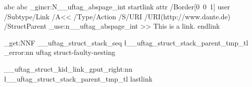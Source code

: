 \documentclass{article}
\begin{document}
\leavevmode
{}
abc
\tagmcend
{}
abc
\tagmcend
{}
\ExplSyntaxOn
\int_gincr:N\g__uftag_abspage_int
\pdfextension startlink
    attr {/Border[0~0~1]}
    user{
        /Subtype/Link%
        /A<<%
         /Type/Action%
         /S/URI%
         /URI(http://www.dante.de)%
         /StructParent \int_use:n{\g__uftag_abspage_int}
         >>}
    This is a link.
\pdfextension endlink%

\seq_get:NNF
    \g__uftag_struct_stack_seq
    \l__uftag_struct_stack_parent_tmp_tl
    {
     \msg_error:nn { uftag } { struct-faulty-nesting }
    }
      
\__uftag_struct_kid_link_gput_right:nn { \l__uftag_struct_stack_parent_tmp_tl }
 {\pdffeedback lastlink}

\ExplSyntaxOff
\tagmcend
\tagstructend
\tagstructend
\tagstructend
\end{document}

